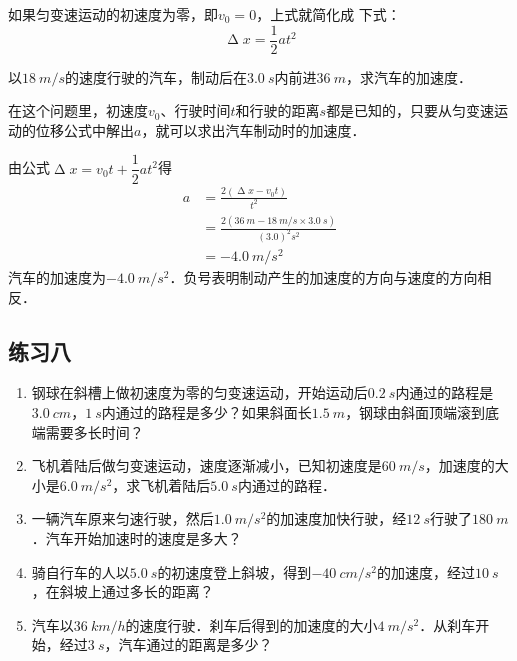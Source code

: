 如果匀变速运动的初速度为零，即$v_0=0$，上式就简化成
下式：
\[\upDelta x=\frac{1}{2}at^2  \]

\begin{example}
    以$\qty{18}{m/s}$的速度行驶的汽车，制动后在$\qty{3.0}{s}$内前进$\qty{36}{m}$，求汽车的加速度．
\end{example}

\begin{solution}
    在这个问题里，初速度$v_0$、行驶时间$t$和行驶的距离$s$都是已知的，只要从匀变速运动的位移公式中解出$a$，就可以求出汽车制动时的加速度．

    由公式$\upDelta x=v_0t+\dfrac{1}{2}at^2$得
    \[\begin{split}
            a & =\frac{2(\upDelta x-v_0t)}{t^2}                                          \\
              & =\frac{2(\qty{36}{m}-\qty{18}{m/s}\times \qty{3.0}{s})}{(3.0)^2\si{s^2}} \\
              & =\qty{-4.0}{m/s^2}
        \end{split} \]
    汽车的加速度为$\qty{-4.0}{m/s^2}$．负号表明制动产生的加速度的方向与速度的方向相反．
\end{solution}

\subsection*{练习八}

\begin{enumerate}
    \item 钢球在斜槽上做初速度为零的匀变速运动，开始运动后$\qty{0.2}{s}$内通过的路程是$\qty{3.0}{cm}$，$\qty{1}{s}$内通过的路程是多少？如果斜面长$\qty{1.5}{m}$，钢球由斜面顶端滚到底端需要多长时间？


    \item 飞机着陆后做匀变速运动，速度逐渐减小，已知初速度是$\qty{60}{m/s}$，加速度的大小是$\qty{6.0}{m/s^2}$，求飞机着陆后$\qty{5.0}{s}$内通过的路程．


    \item 一辆汽车原来匀速行驶，然后$\qty{1.0}{m/s^2}$的加速度加快行驶，经$\qty{12}{s}$行驶了$\qty{180}{m}$．汽车开始加速时的速度是多大？


    \item 骑自行车的人以$\qty{5.0}{s}$的初速度登上斜坡，得到$\qty{-40}{cm/s^2}$的加速度，经过$\qty{10}{s}$，在斜坡上通过多长的距离？

    \item 汽车以$\qty{36}{km/h}$的速度行驶．刹车后得到的加速度的大小$\qty{4}{m/s^2}$．从刹车开始，经过$\qty{3}{s}$，汽车通过的距离是多少？
\end{enumerate}

